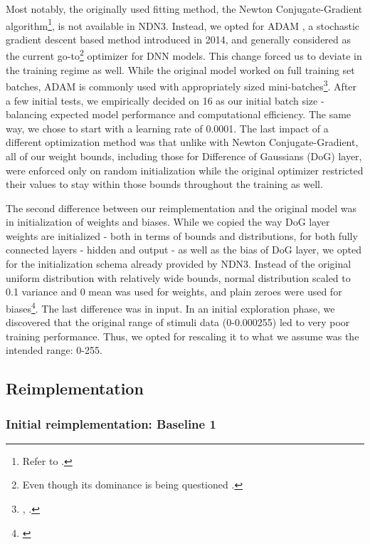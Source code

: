 Most notably, the originally used fitting method, the Newton Conjugate-Gradient algorithm\footnote{Refer to .}, is not available in NDN3. Instead, we opted for ADAM \citep{kingma2014adam}, a stochastic gradient descent based method introduced in 2014, and generally considered as the current go-to\footnote{Even though its dominance is being questioned \citep{2019arXiv191005446C}.} optimizer for DNN models. This change forced us to deviate in the training regime as well. While the original model worked on full training set batches, ADAM is commonly used with appropriately sized mini-batches\footnote{\citep{2017arXiv170508741H}, \citep{2017arXiv171100489S}.}. After a few initial tests, we empirically decided on 16 as our initial batch size - balancing expected model performance and computational efficiency. The same way, we chose to start with a learning rate of 0.0001. The last impact of a different optimization method was that unlike with Newton Conjugate-Gradient, all of our weight bounds, including those for Difference of Gaussians (DoG) layer, were enforced only on random initialization while the original optimizer restricted their values to stay within those bounds throughout the training as well.

The second difference between our reimplementation and the original model was in initialization of weights and biases. While we copied the way DoG layer weights are initialized - both in terms of bounds and distributions, for both fully connected layers - hidden and output - as well as the bias of DoG layer, we opted for the initialization schema already provided by NDN3. Instead of the original uniform distribution with relatively wide bounds, normal distribution scaled to 0.1 variance and 0 mean was used for weights, and plain zeroes were used for biases\footnote{\citep{glorot}}. The last difference was in input. In an initial exploration phase, we discovered that the original range of stimuli data (0-0.000255) led to very poor training performance. Thus, we opted for rescaling it to what we assume was the intended range: 0-255.

\subsection{Reimplementation}
\subsubsection{Initial reimplementation: Baseline 1}

